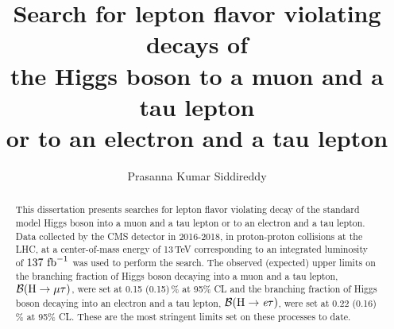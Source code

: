 \documentclass[final,numrefs,sort&compress,noinfo]{nddiss2e}
\begin{document}


\newlength\cmsTabSkip
\setlength\cmsTabSkip{2ex}


\frontmatter %

\title{Search for lepton flavor violating decays of \protect\\ the Higgs boson to a muon and a tau lepton \protect\\ or to an electron and a tau lepton}
\author{Prasanna Kumar Siddireddy}

\maketitle
%
%

{} %
\makecopyright

\begin{abstract}
This dissertation presents searches for lepton flavor violating decay of the standard model Higgs boson into a muon and a tau lepton or to an electron and a tau lepton. Data collected by the CMS detector in 2016-2018, in proton-proton collisions at the LHC, at a center-of-mass energy of 13\,TeV corresponding to an integrated luminosity of $137~\text{fb}^{-1}$ was used to perform the search. The observed (expected) upper limits on the branching fraction of Higgs boson decaying into a muon and a tau lepton, $\mathcal{B}(\text{H} \to \mu \tau)$, were set at 0.15 (0.15)\,\% at 95\% CL and the branching fraction of Higgs boson decaying into an electron and a tau lepton, $\mathcal{B}(\text{H} \to \textit{e} \tau)$, were set at 0.22 (0.16)\,\% at 95\% CL. These are the most stringent limits set on these processes to date.

\end{abstract}
\end{document}
